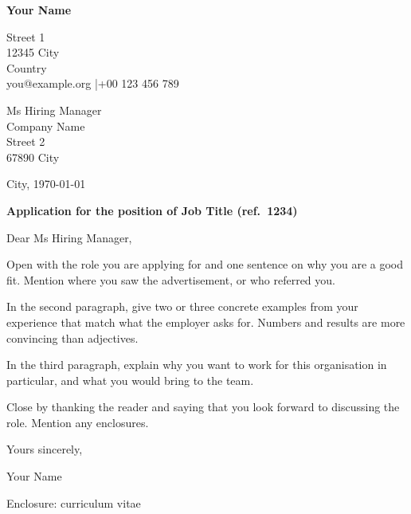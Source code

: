 \documentclass[11pt,a4paper]{article}
\makeatletter
\newcommand{\sendername}{Your Name}
\newcommand{\senderaddress}{Street 1\\ 12345 City\\ Country}
\newcommand{\sendercontact}{you@example.org \quad|\quad +00 123 456 789}
\newcommand{\recipient}{Ms Hiring Manager\\ Company Name\\ Street 2\\ 67890 City}
\newcommand{\subjectline}{Application for the position of Job Title (ref.\ 1234)}
\makeatother
\begin{document}
{\LARGE\bfseries\color{accent}\sendername}\par
\vspace{-0.4em}
{\small\senderaddress\\ \sendercontact}\par
\vspace{1.5em}

\begin{minipage}[t]{0.6\linewidth}
  \recipient
\end{minipage}%
\begin{minipage}[t]{0.4\linewidth}
  \raggedleft City, \today
\end{minipage}

\vspace{1.5em}
\textbf{\subjectline}

Dear Ms Hiring Manager,

Open with the role you are applying for and one sentence on why you are a good
fit. Mention where you saw the advertisement, or who referred you.

In the second paragraph, give two or three concrete examples from your
experience that match what the employer asks for. Numbers and results are more
convincing than adjectives.

In the third paragraph, explain why you want to work for this organisation in
particular, and what you would bring to the team.

Close by thanking the reader and saying that you look forward to discussing
the role. Mention any enclosures.

Yours sincerely,

\vspace{2.5em}
\sendername

\vspace{1em}
{\small Enclosure: curriculum vitae}
\end{document}
